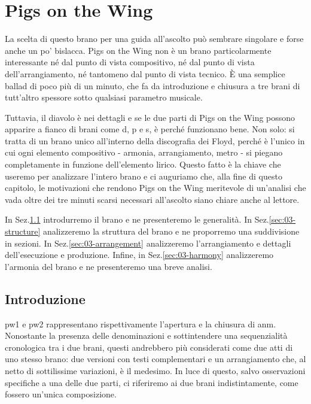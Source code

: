 \documentclass[class=book, crop=false, oneside, 12pt]{standalone}
\begin{document}
    \chapter{Pigs on the Wing}
    \label{ch:03-pigs}
    La scelta di questo brano per una guida all'ascolto può sembrare singolare e forse anche un po' bislacca. Pigs on the Wing non è un brano particolarmente interessante né dal punto di vista compositivo, né dal punto di vista dell'arrangiamento, né tantomeno dal punto di vista tecnico. È una semplice ballad di poco più di un minuto, che fa da introduzione e chiusura a tre brani di tutt'altro spessore sotto qualsiasi parametro musicale.

    Tuttavia, il diavolo è nei dettagli e se le due parti di Pigs on the Wing possono apparire a fianco di brani come \acrshort{d}, \acrshort{p} e \acrshort{s}, è perché funzionano bene. Non solo: si tratta di un brano unico all'interno della discografia dei Floyd, perché è l'unico in cui ogni elemento compositivo - armonia, arrangiamento, metro - si piegano completamente in funzione dell'elemento lirico. Questo fatto è la chiave che useremo per analizzare l'intero brano e ci auguriamo che, alla fine di questo capitolo, le motivazioni che rendono Pigs on the Wing meritevole di un'analisi che vada oltre dei tre minuti scarsi necessari all'ascolto siano chiare anche al lettore.

    In Sez.\ref{sec:03-intro} introdurremo il brano e ne presenteremo le generalità. In Sez.\ref{sec:03-structure} analizzeremo la struttura del brano e ne proporremo una suddivisione in sezioni. In Sez.\ref{sec:03-arrangement} analizzeremo l'arrangiamento e dettagli dell'esecuzione e produzione. Infine, in Sez.\ref{sec:03-harmony} analizzeremo l'armonia del brano e ne presenteremo una breve analisi.

    \section{Introduzione}
    \label{sec:03-intro}
    \acrfull{pw1} e \acrfull{pw2} rappresentano rispettivamente l'apertura e la chiusura di \acrshort{anm}. Nonostante la presenza delle denominazioni  e  sottintendere una sequenzialità cronologica tra i due brani, questi andrebbero più considerati come due atti di uno stesso brano: due versioni con testi complementari e un arrangiamento che, al netto di sottilissime variazioni, è il medesimo. In luce di questo, salvo osservazioni specifiche a una delle due parti, ci riferiremo ai due brani indistintamente, come fossero un'unica composizione.
\end{document}
